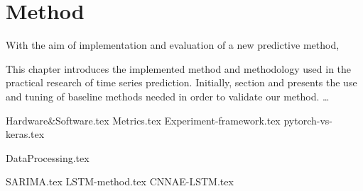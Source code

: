 \chapter{Method}
\label{section:Method}

With the aim of implementation and evaluation of a new predictive method,

This chapter introduces the implemented method and methodology used in the practical research of time series prediction.
Initially, section  and  presents the use and tuning of baseline methods needed in order to validate our method.
\dots


{Hardware&Software.tex}
{Metrics.tex}
{Experiment-framework.tex}
{pytorch-vs-keras.tex}

{DataProcessing.tex}


{SARIMA.tex}
{LSTM-method.tex}
{CNNAE-LSTM.tex}
